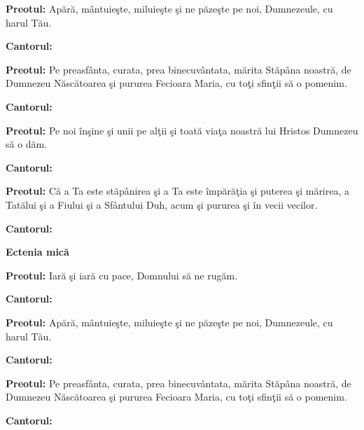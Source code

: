 \documentclass[11pt,letterpaper]{book} \usepackage{ucs}
\newcommand{\mysection}[1]{\begin{center}{\Large \bf #1}\end{center}}
\begin{document}
  {\bf Preotul:} Apără, mântuieşte, miluieşte şi ne păzeşte pe noi,
  Dumnezeule, cu harul Tău.
  \pagebreak

  {\bf Cantorul:}
  \begin{center}
  \end{center}

  {\bf Preotul:} Pe preasfânta, curata, prea binecuvântata, mărita
  Stăpâna noastră, de Dumnezeu Născătoarea şi pururea Fecioara Maria,
  cu toţi sfinţii să o pomenim.
  
  {\bf Cantorul:}


  {\bf Preotul:} Pe noi înşine şi unii pe alţii şi toată viaţa noastră
  lui Hristos Dumnezeu să o dăm.

  {\bf Cantorul:}
  \begin{center}
  \end{center}

  {\bf Preotul:} Că a Ta este stăpânirea şi a Ta este împărăţia şi
  puterea şi mărirea, a Tatălui şi a Fiului şi a Sfântului Duh, acum
  şi pururea şi în vecii vecilor.

  {\bf Cantorul:}
  \begin{center}
  \end{center}
  \pagebreak

  \pagebreak

  \mysection{Ectenia mică}
    
  {\bf Preotul:} Iară şi iară cu pace, Domnului să ne rugăm.

  {\bf Cantorul:}
  \begin{center}
  \end{center}

  {\bf Preotul:} Apără, mântuieşte, miluieşte şi ne păzeşte pe noi,
  Dumnezeule, cu harul Tău.

  {\bf Cantorul:}
  \begin{center}
  \end{center}

  {\bf Preotul:} Pe preasfânta, curata, prea binecuvântata, mărita
  Stăpâna noastră, de Dumnezeu Născătoarea şi pururea Fecioara Maria,
  cu toţi sfinţii să o pomenim.
  \pagebreak
  
  {\bf Cantorul:}
\end{document}
